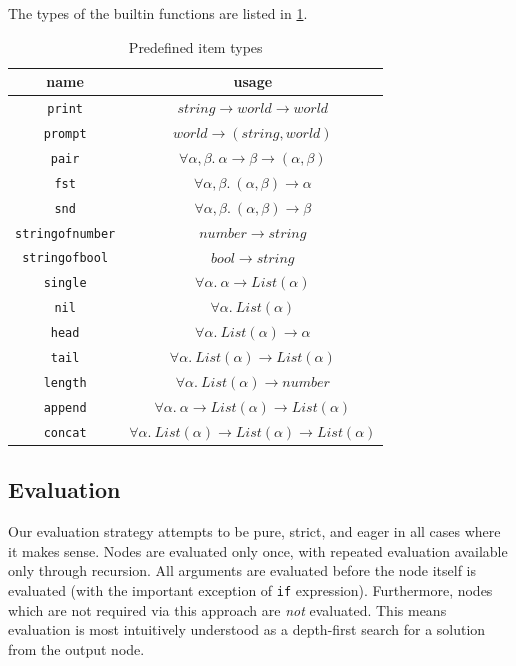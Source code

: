 \documentclass[12pt,UTF8,a4]{article}
\newcommand{\code}[1]{\texttt{#1}}
\begin{document}
The types of the builtin functions are listed in \ref{tab:pitemts}.
\begin{table}[h!]
\center
\begin{tabular}{c|c}
\hline
name & usage \\
\hline
\code{print} & $string \rightarrow world \rightarrow world$\\
\code{prompt} & $world \rightarrow (string, world)$\\
\code{pair} & $\forall \alpha,\beta.\ \alpha \rightarrow \beta \rightarrow (\alpha, \beta)$\\
\code{fst} & $\forall \alpha,\beta.\ (\alpha, \beta) \rightarrow \alpha$ \\
\code{snd} & $\forall \alpha,\beta.\ (\alpha, \beta) \rightarrow \beta$ \\
\code{stringofnumber} & $number \rightarrow string$\\
\code{stringofbool} & $bool \rightarrow string$\\
\code{single} & $\forall \alpha.\ \alpha \rightarrow List(\alpha)$ \\
\code{nil} & $\forall \alpha.\ List(\alpha)$ \\
\code{head} & $\forall \alpha.\ List(\alpha) \rightarrow \alpha$ \\
\code{tail} & $\forall \alpha.\ List(\alpha) \rightarrow List(\alpha)$ \\
\code{length} & $\forall \alpha.\ List(\alpha) \rightarrow number$ \\
\code{append} & $\forall \alpha.\ \alpha \rightarrow List(\alpha) \rightarrow List(\alpha)$ \\
\code{concat} & $\forall \alpha.\ List(\alpha) \rightarrow List(\alpha) \rightarrow List(\alpha)$
\end{tabular}
\caption{Predefined item types}\label{tab:pitemts}
\end{table}

\subsection{Evaluation}
Our evaluation strategy attempts to be pure, strict, and eager in all
cases where it makes sense. Nodes are evaluated only once, with
repeated evaluation available only through recursion. All arguments
are evaluated before the node itself is evaluated (with the important
exception of \code{if} expression). Furthermore, nodes which are not
required via this approach are {\em not} evaluated. This means
evaluation is most intuitively understood as a depth-first search for
a solution from the output node.
\end{document}
